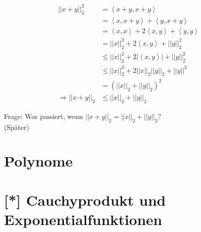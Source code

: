 \documentclass[11pt, twoside, a4paper]{article}
\theoremstyle{plain}
\newcommand{\pair}[1]{\left(#1\right)}
\newcommand{\abs}[1]{\left|#1\right|}
\newcommand{\norm}[1]{\abs{\abs{#1}}}
\newcommand{\impl}[0]{\Rightarrow{}}
\newcommand{\sprod}[1]{\left<#1\right>}
\begin{document}
    \begin{align*}
        \norm{x+y}_2^2 &= \sprod{x+y,x+y}\\
        &= \sprod{x,x+y}+ \sprod{y,x+y}\\
        &= \sprod{x,x} + 2 \sprod{x,y} + \sprod{y,y}\\
        &= \norm{x}_2^2 + 2\sprod{x,y} + \norm{y}_2^2\\
        &\leq \norm{x}_2^2 + 2\abs{\sprod{x,y}} + \norm{y}_2^2\\
        &\leq \norm{x}_2^2 + 2\norm{x}_2 \norm{y}_2 + \norm{y}^2\\
        &= \pair{\norm{x}_2 + \norm{y}_2}^2\\
        \impl \norm{x+y}_2 &\leq \norm{x}_2 + \norm{y}_2\tag{Dreiecksungleichung für Eukl. Norm}
    \end{align*}

    \noindent Frage: Was passiert, wenn $\norm{x+y}_2 = \norm{x}_2 + \norm{y}_2$?\\
    (Später)

    \newpage


    \section{Polynome}
    


    \section{[*] Cauchyprodukt und Exponentialfunktionen}
    \thispagestyle{pagenumberonly}
\end{document}
